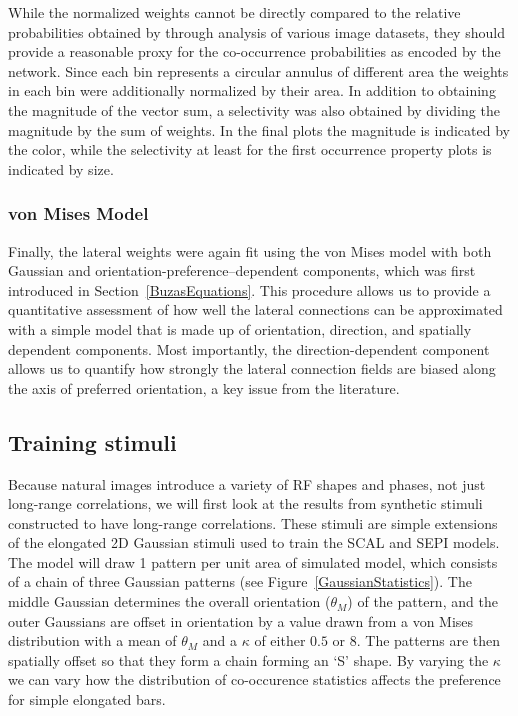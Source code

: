 While the normalized weights cannot be directly compared to the
relative probabilities obtained by \cite{Geisler2001} through analysis
of various image datasets, they should provide a reasonable proxy for
the co-occurrence probabilities as encoded by the network. Since each
bin represents a circular annulus of different area the weights in
each bin were additionally normalized by their area. In addition to
obtaining the magnitude of the vector sum, a selectivity was also
obtained by dividing the magnitude by the sum of weights. In the final
plots the magnitude is indicated by the color, while the selectivity
at least for the first occurrence property plots is indicated by size.

\subsubsection*{von Mises Model}

Finally, the lateral weights were again fit using the von Mises model
with both Gaussian and orientation-preference--dependent components,
which was first introduced in Section~\ref{BuzasEquations}. This procedure
allows us to provide a quantitative assessment of how well the lateral
connections can be approximated with a simple model that is made up of
orientation, direction, and spatially dependent components. Most
importantly, the direction-dependent component allows us to quantify
how strongly the lateral connection fields are biased along the axis
of preferred orientation, a key issue from the literature.

\subsection{Training stimuli}
\label{synthetic}

Because natural images introduce a variety of RF shapes and phases,
not just long-range correlations, we will first look at the results
from synthetic stimuli constructed to have long-range correlations.
These stimuli are simple extensions of the
elongated 2D Gaussian stimuli used to train the SCAL and SEPI models.
The model will draw 1 pattern per unit area of simulated model, which consists of
a chain of three Gaussian patterns (see
Figure~\ref{GaussianStatistics}). The middle Gaussian determines the
overall orientation ($\theta_M$) of the pattern, and the outer
Gaussians are offset in orientation by a value drawn from a von Mises
distribution with a mean of $\theta_M$ and a $\kappa$ of either $0.5$
or $8$. The patterns are then spatially offset so that they form a
chain forming an `S' shape. By varying the $\kappa$ we can vary how
the distribution of co-occurence statistics affects the preference
for simple elongated bars.

